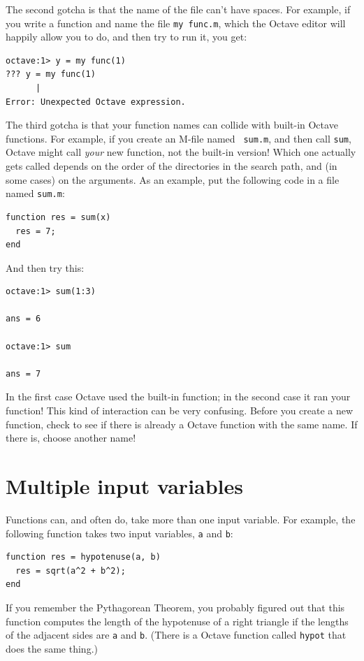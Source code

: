 \documentclass{book}
\begin{document}
The second gotcha is that the name of the file can't have spaces.
For example, if you write a function and name the file {\tt my func.m},
which the Octave editor will happily allow you to do, and then
try to run it, you get:

\begin{verbatim}
octave:1> y = my func(1)
??? y = my func(1)
      |
Error: Unexpected Octave expression.
\end{verbatim}

The third gotcha is that your function names can collide with built-in
Octave functions. For example, if you create an M-file named {\tt
sum.m}, and then call {\tt sum}, Octave might call {\em your} new
function, not the built-in version! Which one actually gets called
depends on the order of the directories in the search path, and
(in some cases) on the arguments. As an example, put the following
code in a file named {\tt sum.m}:

\begin{verbatim}
function res = sum(x)
  res = 7;
end
\end{verbatim}

And then try this:

\begin{verbatim}
octave:1> sum(1:3)

ans = 6

octave:1> sum

ans = 7
\end{verbatim}

In the first case Octave used the built-in function; in the second
case it ran your function! This kind of interaction can be very
confusing. Before you create a new function, check to see if there is
already a Octave function with the same name. If there is, choose
another name!


\section{Multiple input variables}
\label{hypotenuse}

Functions can, and often do, take more than one input variable.
For example, the following function takes two input variables,
{\tt a} and {\tt b}:

\begin{verbatim}
function res = hypotenuse(a, b)
  res = sqrt(a^2 + b^2);
end
\end{verbatim}

If you remember the Pythagorean Theorem, you probably figured out
that this function computes the length of the hypotenuse of a right
triangle if the lengths of the adjacent sides are {\tt a}
and {\tt b}. (There is a Octave function called {\tt hypot} that does
the same thing.)
\end{document}
